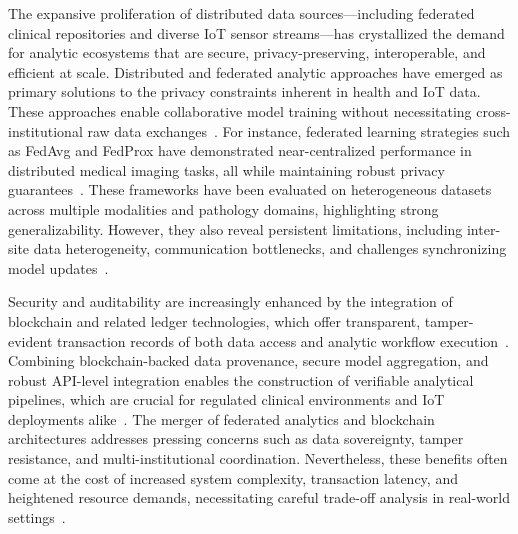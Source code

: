 \documentclass[sigconf]{acmart}
\begin{document}
The expansive proliferation of distributed data sources—including federated clinical repositories and diverse IoT sensor streams—has crystallized the demand for analytic ecosystems that are secure, privacy-preserving, interoperable, and efficient at scale. Distributed and federated analytic approaches have emerged as primary solutions to the privacy constraints inherent in health and IoT data. These approaches enable collaborative model training without necessitating cross-institutional raw data exchanges~\cite{ref4,ref5,ref10,ref13,ref14,ref16,ref17,ref18,ref19,ref20,ref21,ref22,ref23,ref24,ref25,ref30,ref31,ref33,ref34,ref35}. For instance, federated learning strategies such as FedAvg and FedProx have demonstrated near-centralized performance in distributed medical imaging tasks, all while maintaining robust privacy guarantees~\cite{ref31}. These frameworks have been evaluated on heterogeneous datasets across multiple modalities and pathology domains, highlighting strong generalizability. However, they also reveal persistent limitations, including inter-site data heterogeneity, communication bottlenecks, and challenges synchronizing model updates~\cite{ref4,ref5,ref34,ref82,ref84}.

Security and auditability are increasingly enhanced by the integration of blockchain and related ledger technologies, which offer transparent, tamper-evident transaction records of both data access and analytic workflow execution~\cite{ref13,ref14,ref16,ref19,ref21,ref22,ref23,ref30,ref32,ref31}. Combining blockchain-backed data provenance, secure model aggregation, and robust API-level integration enables the construction of verifiable analytical pipelines, which are crucial for regulated clinical environments and IoT deployments alike~\cite{ref20,ref35,ref44,ref45,ref46,ref50,ref51,ref61,ref62,ref64,ref65,ref76,ref77,ref106}. The merger of federated analytics and blockchain architectures addresses pressing concerns such as data sovereignty, tamper resistance, and multi-institutional coordination. Nevertheless, these benefits often come at the cost of increased system complexity, transaction latency, and heightened resource demands, necessitating careful trade-off analysis in real-world settings~\cite{ref44,ref90,ref106}.
\end{document}
